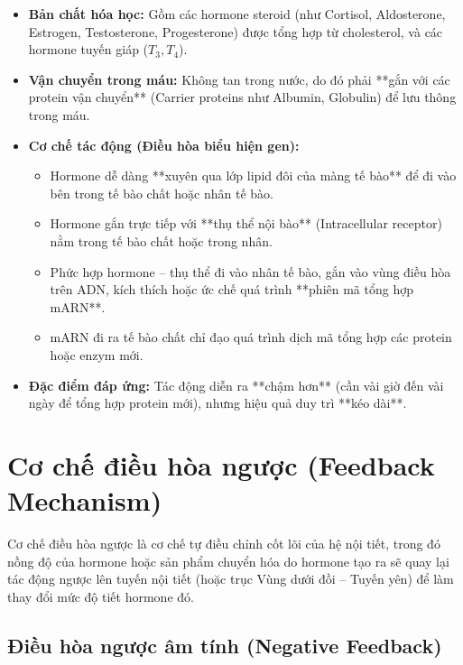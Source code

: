 \begin{itemize}
    \item \textbf{Bản chất hóa học:} Gồm các hormone steroid (như Cortisol, Aldosterone, Estrogen, Testosterone, Progesterone) được tổng hợp từ cholesterol, và các hormone tuyến giáp ($T_3, T_4$).
    \item \textbf{Vận chuyển trong máu:} Không tan trong nước, do đó phải **gắn với các protein vận chuyển** (Carrier proteins như Albumin, Globulin) để lưu thông trong máu.
    \item \textbf{Cơ chế tác động (Điều hòa biểu hiện gen):}
    \begin{itemize}
        \item Hormone dễ dàng **xuyên qua lớp lipid đôi của màng tế bào** để đi vào bên trong tế bào chất hoặc nhân tế bào.
        \item Hormone gắn trực tiếp với **thụ thể nội bào** (Intracellular receptor) nằm trong tế bào chất hoặc trong nhân.
        \item Phức hợp hormone -- thụ thể đi vào nhân tế bào, gắn vào vùng điều hòa trên ADN, kích thích hoặc ức chế quá trình **phiên mã tổng hợp mARN**.
        \item mARN đi ra tế bào chất chỉ đạo quá trình dịch mã tổng hợp các protein hoặc enzym mới.
    \end{itemize}
    \item \textbf{Đặc điểm đáp ứng:} Tác động diễn ra **chậm hơn** (cần vài giờ đến vài ngày để tổng hợp protein mới), nhưng hiệu quả duy trì **kéo dài**.
\end{itemize}

\section{Cơ chế điều hòa ngược (Feedback Mechanism)}

Cơ chế điều hòa ngược là cơ chế tự điều chỉnh cốt lõi của hệ nội tiết, trong đó nồng độ của hormone hoặc sản phẩm chuyển hóa do hormone tạo ra sẽ quay lại tác động ngược lên tuyến nội tiết (hoặc trục Vùng dưới đồi -- Tuyến yên) để làm thay đổi mức độ tiết hormone đó.

\subsection{Điều hòa ngược âm tính (Negative Feedback)}

